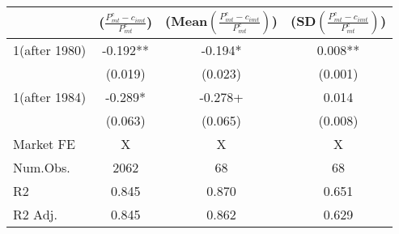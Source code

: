 
\begin{tabular}[t]{lccc}
\toprule
  & ($\frac{P_{mt}^c-c_{imt}}{P_{mt}^c}$) & (Mean$(\frac{P_{mt}^c-c_{imt}}{P_{mt}^c})$) & (SD$(\frac{P_{mt}^c-c_{imt}}{P_{mt}^c})$)\\
\midrule
1(after 1980) & -0.192** & -0.194* & 0.008**\\
 & (0.019) & (0.023) & (0.001)\\
1(after 1984) & -0.289* & -0.278+ & 0.014\\
 & (0.063) & (0.065) & (0.008)\\
\midrule
Market FE & X & X & X\\
Num.Obs. & 2062 & 68 & 68\\
R2 & 0.845 & 0.870 & 0.651\\
R2 Adj. & 0.845 & 0.862 & 0.629\\
\bottomrule
\end{tabular}
